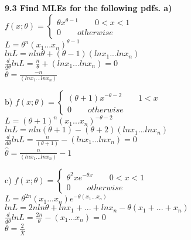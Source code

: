 \bf{9.3} Find MLEs for the following pdfs.
\noindent a) $f(x;\theta )=\begin{cases} \theta { x }^{ \theta -1 }\qquad 0<x<1 \\ 0\qquad otherwise \end{cases}$\\

$L=\theta^{n} (x_{1}...x_{n})^{ \theta -1}$\\
$lnL=nln\theta+(\theta-1)(lnx_{1}...lnx_{n})$\\
$\frac{d}{d\theta}lnL=\frac{n}{\theta}+(lnx_{1}...lnx_{n})=0$\\
$\hat{\theta}=\frac{-n}{(lnx_{1}...lnx_{n})}$



\noindent b) $f(x;\theta )=\begin{cases} (\theta +1) { x }^{  -\theta -2 }\qquad 1<x \\ 0\qquad otherwise \end{cases}$\\

$L=(\theta+1)^{n} (x_{1}...x_{n})^{ -\theta -2}$\\
$lnL=nln(\theta+1)-(\theta+2)(lnx_{1}...lnx_{n})$\\
$\frac{d}{d\theta}lnL=\frac{n}{(\theta+1)}-(lnx_{1}...lnx_{n})=0$\\
$\hat{\theta}=\frac{n}{(lnx_{1}...lnx_{n})}-1$

\noindent c) $f(x;\theta )=\begin{cases} \theta^{2} x{ e }^{ -\theta x }\qquad 0<x<1 \\ 0\qquad otherwise \end{cases}$\\

$L=\theta^{2n}(x_{1}...x_{n})e^{-\theta(x_{1}...x_{n})}$\\
$lnL=2nln\theta+lnx_{1}+...+lnx_{n}-\theta(x_{1}+...+x_{n})$\\
$\frac{d}{d\theta}lnL= \frac{2n}{\theta}-(x_{1}...x_{n})=0$\\
$\hat{\theta}=\frac{2}{\overline{X}}$